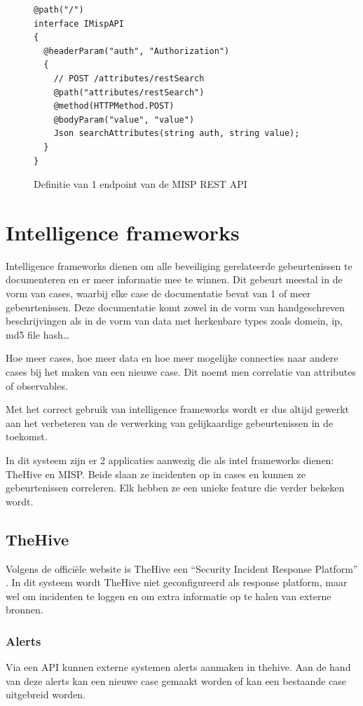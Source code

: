 \documentclass[a4paper,12pt]{report}
\begin{document}
\begin{figure}[H]
  \begin{lstlisting}
@path("/")
interface IMispAPI
{
  @headerParam("auth", "Authorization")
  {
    // POST /attributes/restSearch
    @path("attributes/restSearch")
    @method(HTTPMethod.POST)
    @bodyParam("value", "value")
    Json searchAttributes(string auth, string value);
  }
}
  \end{lstlisting}
  \caption{Definitie van 1 endpoint van de MISP REST API}
  \label{fig:vibe-rest-misp}
\end{figure}

\section{Intelligence frameworks}
Intelligence frameworks dienen om alle beveiliging gerelateerde gebeurtenissen te documenteren en er meer informatie mee te winnen.
Dit gebeurt meestal in de vorm van cases, waarbij elke case de documentatie bevat van 1 of meer gebeurtenissen.
Deze documentatie komt zowel in de vorm van handgeschreven beschrijvingen als in de vorm van data met herkenbare types zoals domein, ip, md5 file hash\dots

Hoe meer cases, hoe meer data en hoe meer mogelijke connecties naar andere cases bij het maken van een nieuwe case.
Dit noemt men correlatie van attributes of observables.

Met het correct gebruik van intelligence frameworks wordt er dus altijd gewerkt aan het verbeteren van de verwerking van gelijkaardige gebeurtenissen in de toekomst.

In dit systeem zijn er 2 applicaties aanwezig die als intel frameworks dienen: TheHive en MISP.
Beide slaan ze incidenten op in cases en kunnen ze gebeurtenissen correleren.
Elk hebben ze een unieke feature die verder bekeken wordt.

\subsection{TheHive}
Volgens de officiële website is TheHive een ``Security Incident Response Platform'' \autocite{thehive:home}.
In dit systeem wordt TheHive niet geconfigureerd als response platform, maar wel om incidenten te loggen en om extra informatie op te halen van externe bronnen.

\subsubsection{Alerts}
Via een API kunnen externe systemen alerts aanmaken in thehive.
Aan de hand van deze alerts kan een nieuwe case gemaakt worden of kan een bestaande case uitgebreid worden.
\end{document}
